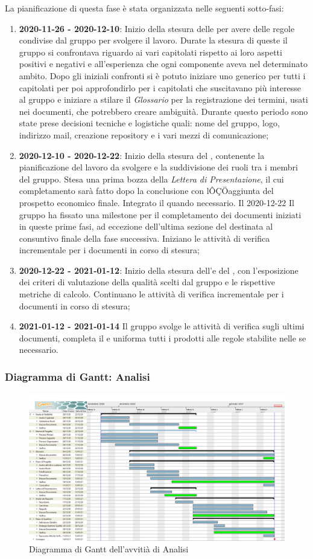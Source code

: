 La pianificazione di questa fase è stata organizzata nelle seguenti sotto-fasi:

\begin{enumerate}
\item \textbf{2020-11-26 - 2020-12-10}:
    Inizio della stesura delle \NdP per avere delle regole condivise dal gruppo per svolgere il lavoro. Durate la stesura di queste il gruppo si confrontava riguardo ai vari capitolati rispetto ai loro aspetti positivi e negativi e all'esperienza che ogni componente aveva nel determinato ambito. Dopo gli iniziali confronti si è potuto iniziare uno \SdF generico per tutti i capitolati per poi approfondirlo per i capitolati che suscitavano più interesse al gruppo e iniziare a stilare il \textit{Glossario} per la registrazione dei termini, usati nei documenti, che potrebbero creare ambiguità. Durante questo periodo sono state prese decisioni tecniche e logistiche quali: nome del gruppo, logo, indirizzo mail, creazione repository e i vari mezzi di comunicazione;
\item \textbf{2020-12-10 - 2020-12-22}:
    Inizio della stesura del \PdP, contenente la pianificazione del lavoro da svolgere e la suddivisione dei ruoli tra i membri del gruppo.
    Stesa una prima bozza della \textit{Lettera di Presentazione}, il cui completamento sarà fatto dopo la conclusione \PdP con lÔÇÖaggiunta del prospetto economico finale. Integrato il \Glossario quando necessario.
    Il 2020-12-22 Il gruppo ha fissato una milestone per il completamento dei documenti iniziati in queste prime fasi, ad eccezione dell'ultima sezione del \PdP destinata al consuntivo finale della fase successiva. Iniziano le attività di verifica incrementale per i documenti in corso di stesura;
\item \textbf{2020-12-22 - 2021-01-12}:
    Inizio della stesura dell'\AdR e del \PdQ, con l'esposizione dei criteri di valutazione della qualità scelti dal gruppo e le rispettive metriche di calcolo. Continuano le attività di verifica incrementale per i documenti in corso di stesura;
\item \textbf{2021-01-12 - 2021-01-14}
    Il gruppo svolge le attività di verifica sugli ultimi documenti, completa il \Glossario e uniforma tutti i prodotti alle regole stabilite nelle \NdP se necessario.
\end{enumerate}

\subsubsection{Diagramma di Gantt: Analisi}

\begin{figure}[ht]
    \centering
    \includegraphics[width=\textwidth]{../../Immagini/Analisi}
    \caption{Diagramma di Gantt dell'avvitià di Analisi}
\end{figure}
